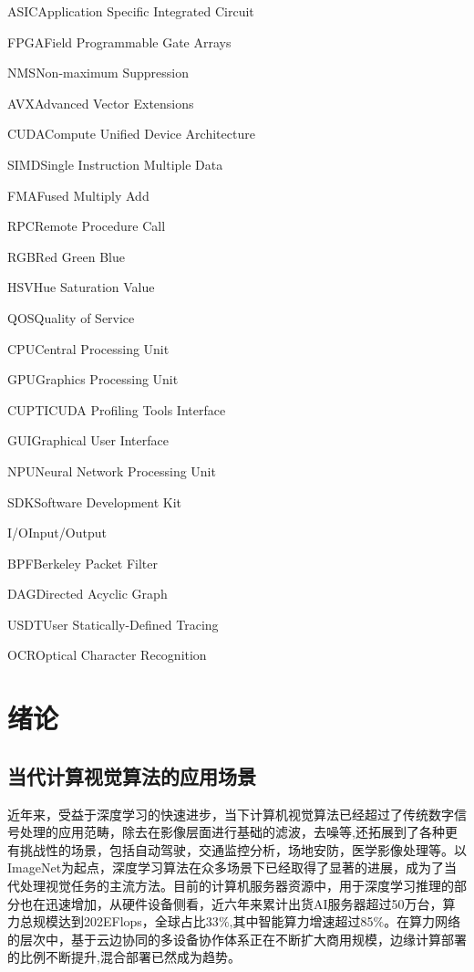 \documentclass[master]{shtthesis}
\makeatletter
\def\ifgraduate{\ifsht@graduate}
\makeatother
\begin{document}
\ifgraduate
\begin{nomenclatures}[缩写]
  \item{ASIC}{Application Specific Integrated Circuit}
  \item{FPGA}{Field Programmable Gate Arrays}
  \item{NMS}{Non-maximum Suppression}
  \item{AVX}{Advanced Vector Extensions}
  \item{CUDA}{Compute Unified Device Architecture}
  \item{SIMD}{Single Instruction Multiple Data}
  \item{FMA}{Fused Multiply Add}
  \item{RPC}{Remote Procedure Call}
  \item{RGB}{Red Green Blue}
  \item{HSV}{Hue Saturation Value}
  \item{QOS}{Quality of Service}
  \item{CPU}{Central Processing Unit}
  \item{GPU}{Graphics Processing Unit}
  \item{CUPTI}{CUDA Profiling Tools Interface}
  \item{GUI}{Graphical User Interface}
  \item{NPU}{Neural Network Processing Unit}
  \item{SDK}{Software Development Kit}
  \item{I/O}{Input/Output}
  \item{BPF}{Berkeley Packet Filter}
  \item{DAG}{Directed Acyclic Graph}
  \item{USDT}{User Statically-Defined Tracing}
  \item{OCR}{Optical Character Recognition}
\end{nomenclatures}

\fi

\mainmatter
\chapter{绪论}

\section{当代计算视觉算法的应用场景}\label{当代计算视觉算法的应用场景}

近年来，受益于深度学习\cite{lecun2015deep}的快速进步，当下计算机视觉算法已经超过了传统数字信号处理的应用范畴，除去在影像层面进行基础的滤波，去噪等\cite{dabov2007image},还拓展到了各种更有挑战性的场景，包括自动驾驶\cite{chen2015deepdriving}，交通监控分析\cite{santos2020real}，场地安防\cite{wang2019deep}，医学影像处理\cite{litjens2017survey}等。以ImageNet\cite{deng2009imagenet}为起点，深度学习算法在众多场景下已经取得了显著的进展，成为了当代处理视觉任务的主流方法。目前的计算机服务器资源中，用于深度学习推理的部分也在迅速增加，从硬件设备侧看，近六年来累计出货AI服务器超过50万台，算力总规模达到202EFlops，全球占比33$\%$,其中智能算力增速超过85$\%$\cite{china2022}。在算力网络的层次中，基于云边协同的多设备协作体系正在不断扩大商用规模，边缘计算部署的比例不断提升,混合部署已然成为趋势。
\end{document}
